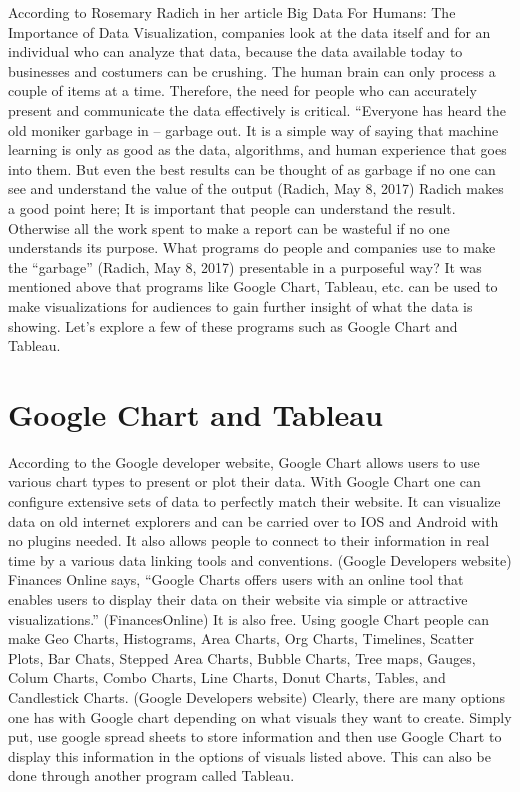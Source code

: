 \documentclass[sigconf]{acmart}
\begin{document}
According to Rosemary Radich in her article Big Data For Humans: The Importance of Data Visualization, companies look at the data itself and for an individual who can analyze that data, because the data available today to businesses and costumers can be crushing. The human brain can only process a couple of items at a time. Therefore, the need for people who can accurately present and communicate the data effectively is critical. “Everyone has heard the old moniker garbage in – garbage out. It is a simple way of saying that machine learning is only as good as the data, algorithms, and human experience that goes into them. But even the best results can be thought of as garbage if no one can see and understand the value of the output (Radich, May 8, 2017) Radich makes a good point here; It is important that people can understand the result. Otherwise all the work spent to make a report can be wasteful if no one understands its purpose. 
What programs do people and companies use to make the “garbage” (Radich, May 8, 2017) presentable in a purposeful way? It was mentioned above that programs like Google Chart, Tableau, etc. can be used to make visualizations for audiences to gain further insight of what the data is showing. Let’s explore a few of these programs such as Google Chart and Tableau. 

\section{Google Chart and Tableau}
According to the Google developer website, Google Chart allows users to use various chart types to present or plot their data. With Google Chart one can configure extensive sets of data to perfectly match their website. It can visualize data on old internet explorers and can be carried over to IOS and Android with no plugins needed. It also allows people to connect to their information in real time by a various data linking tools and conventions. (Google Developers website) Finances Online says, “Google Charts offers users with an online tool that enables users to display their data on their website via simple or attractive visualizations.” (FinancesOnline) It is also free. Using google Chart people can make Geo Charts, Histograms, Area Charts, Org Charts, Timelines, Scatter Plots, Bar Chats, Stepped Area Charts, Bubble Charts, Tree maps, Gauges, Colum Charts, Combo Charts, Line Charts, Donut Charts, Tables, and Candlestick Charts. (Google Developers website) Clearly, there are many options one has with Google chart depending on what visuals they want to create. Simply put, use google spread sheets to store information and then use Google Chart to display this information in the options of visuals listed above. This can also be done through another program called Tableau. 
\end{document}
